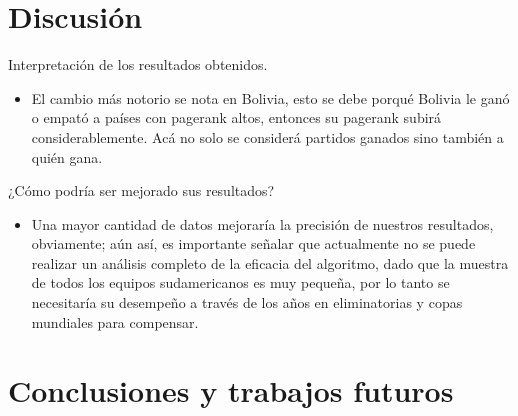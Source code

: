\documentclass[twocolumn]{article}
\begin{document}



\section{Discusión}
Interpretación de los resultados obtenidos.
\begin{itemize}
\item El cambio más notorio se nota en Bolivia, esto se debe porqué Bolivia le ganó o empató a países con pagerank altos, entonces su pagerank subirá considerablemente. Acá no solo se considerá partidos ganados sino también a quién gana. 
\end{itemize}
¿Cómo podría ser mejorado sus resultados?
\begin{itemize}
\item Una mayor cantidad de datos mejoraría la precisión de nuestros resultados, obviamente; aún así, es importante señalar que actualmente no se puede realizar un análisis completo de la eficacia del algoritmo, dado que la muestra de todos los equipos sudamericanos es muy pequeña, por lo tanto se necesitaría su desempeño a través de los años en eliminatorias y copas mundiales para compensar.

\end{itemize}
 





\section{Conclusiones y trabajos futuros}
\end{document}
